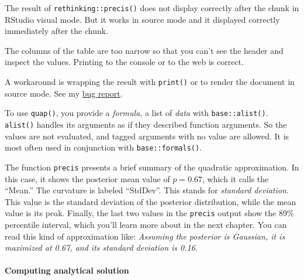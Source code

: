 \documentclass[
  letterpaper,
  DIV=11,
  numbers=noendperiod]{scrreprt}
\let\oldparagraph\paragraph
\renewcommand{\paragraph}[1]{\oldparagraph{#1}\mbox{}}
\begin{document}
\begin{tcolorbox}[enhanced jigsaw, colframe=quarto-callout-warning-color-frame, colback=white, toprule=.15mm, breakable, arc=.35mm, bottomtitle=1mm, colbacktitle=quarto-callout-warning-color!10!white, toptitle=1mm, titlerule=0mm, title=\textcolor{quarto-callout-warning-color}{\faExclamationTriangle}\hspace{0.5em}{\texttt{precis()} results not printed correctly from visual mode}, leftrule=.75mm, opacityback=0, rightrule=.15mm, opacitybacktitle=0.6, bottomrule=.15mm, left=2mm, coltitle=black]

The result of \texttt{rethinking::precis()} does not display correctly
after the chunk in RStudio visual mode. But it works in source mode and
it displayed correctly immediately after the chunk.

The columns of the table are too narrow so that you can't see the header
and inspect the values. Printing to the console or to the web is
correct.

A workaround is wrapping the result with \texttt{print()} or to render
the document in source mode. See my
\href{https://github.com/rstudio/rstudio/issues/13227}{bug report}.

\end{tcolorbox}

To use \texttt{quap()}, you provide a \emph{formula}, a list of
\emph{data} with \texttt{base::alist()}. \texttt{alist()} handles its
arguments as if they described function arguments. So the values are not
evaluated, and tagged arguments with no value are allowed. It is most
often used in conjunction with \texttt{base::formals()}.

The function \texttt{precis} presents a brief summary of the quadratic
approximation. In this case, it shows the posterior mean value of
\(p = 0.67\), which it calls the ``Mean.'' The curvature is labeled
``StdDev''. This stands for \emph{standard deviation}. This value is the
standard deviation of the posterior distribution, while the mean value
is its peak. Finally, the last two values in the \texttt{precis} output
show the 89\% percentile interval, which you'll learn more about in the
next chapter. You can read this kind of approximation like:
\emph{Assuming the posterior is Gaussian, it is maximized at 0.67, and
its standard deviation is 0.16}.

\hypertarget{computing-analytical-solution}{%
\paragraph{Computing analytical
solution}\label{computing-analytical-solution}}
\end{document}

